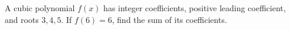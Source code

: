 A cubic polynomial $f(x)$ has integer coefficients, positive leading coefficient, and roots $3,4,5$. If $f(6)=6$, find the sum of its coefficients.
